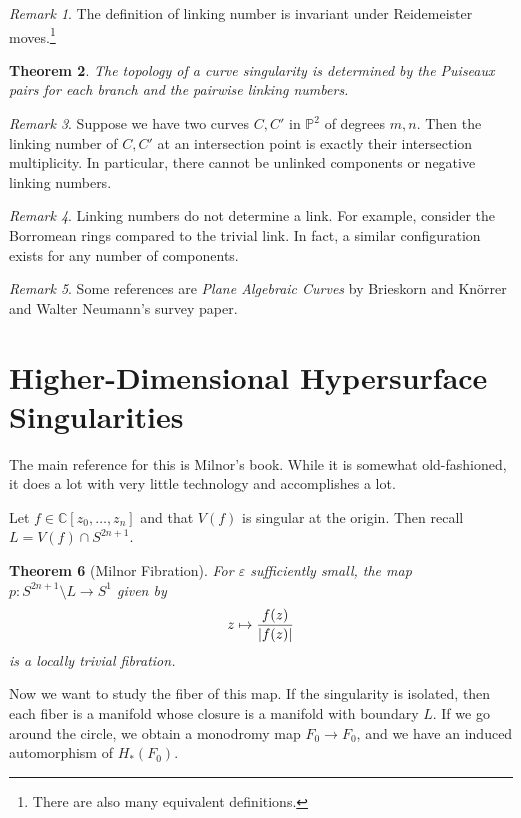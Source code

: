 \documentclass[leqno, openany]{memoir}
\newtheorem{thm}{Theorem}[chapter]
\theoremstyle{definition}
\theoremstyle{remark}
\newtheorem{rmk}[thm]{Remark}
\theoremstyle{plain}
\theoremstyle{definition}
\theoremstyle{remark}
\newcommand{\C}{\mathbb{C}}
\renewcommand{\P}{\mathbb{P}}
\newcommand{\ep}{\varepsilon}
\begin{document}
\begin{rmk}
    The definition of linking number is invariant under Reidemeister moves.\footnote{There are also many equivalent definitions.}
\end{rmk}

\begin{thm}
    The topology of a curve singularity is determined by the Puiseaux pairs for each branch and the pairwise linking numbers.
\end{thm}

\begin{rmk}
    Suppose we have two curves $C, C'$ in $\P^2$ of degrees $m, n$. Then the linking number of $C, C'$ at an intersection point is exactly their intersection multiplicity. In particular, there cannot be unlinked components or negative linking numbers.
\end{rmk}

\begin{rmk}
    Linking numbers do not determine a link. For example, consider the Borromean rings compared to the trivial link. In fact, a similar configuration exists for any number of components.
\end{rmk}

\begin{rmk}
    Some references are \textit{Plane Algebraic Curves} by Brieskorn and Kn\"orrer and Walter Neumann's survey paper.
\end{rmk}

\section{Higher-Dimensional Hypersurface Singularities}%
\label{sec:higher_dimensional_hypersurface_singularities}

The main reference for this is Milnor's book. While it is somewhat old-fashioned, it does a lot with very little technology and accomplishes a lot.

Let $f \in \C[z_0, \ldots, z_n]$ and that $V(f)$ is singular at the origin. Then recall $L = V(f) \cap S^{2n+1}$.

\begin{thm}[Milnor Fibration]
    For $\ep$ sufficiently small, the map $p: S^{2n+1} \setminus {L} \to S^1$ given by
    \[ z \mapsto \frac{f(z)}{\abs{f(z)}} \] 
    is a locally trivial fibration.
\end{thm}

Now we want to study the fiber of this map. If the singularity is isolated, then each fiber is a manifold whose closure is a manifold with boundary $L$. If we go around the circle, we obtain a monodromy map $F_0 \to F_0$, and we have an induced automorphism of $H_*(F_0)$.
\end{document}
